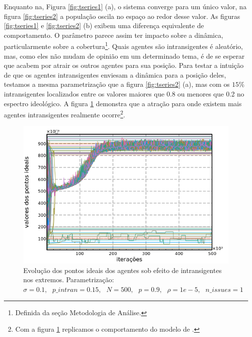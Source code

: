     Enquanto na, Figura \ref{fig:tseries1} (a), o sistema converge para um único
    valor, na figura \ref{fig:tseries2} a população oscila no espaço ao redor
    desse valor. As figuras \ref{fig:tseries1} e \ref{fig:tseries2} (b) exibem
    uma diferença equivalente de comportamento. O parâmetro parece assim ter
    impacto sobre a dinâmica, particularmente sobre a
    cobertura\footnote{Definida da seção Metodologia de Análise.}. Quais agentes
    são intransigentes é aleatório, mas, como eles não mudam de opinião em um
    determinado tema, é de se esperar que acabem por atrair os outros agentes
    para sua posição. Para testar a intuição de que os agentes intransigentes
    enviesam a dinâmica para a posição deles, testamos a mesma parametrização
    que a figura \ref{fig:tseries2} (a), mas com os \(15\%\) intransigentes
    localizados entre os valores maiores que 0.8 ou menores que 0.2 no espectro
    ideológico. A figura \ref{fig:tseries3} demonstra que a atração para onde
    existem mais agentes intransigentes realmente ocorre\footnote{Com a figura
      \ref{fig:tseries3} replicamos o comportamento do modelo de
      .}.

      \begin{figure}[H]
    \centering
    \includegraphics[scale=0.7]{ims/sigma01extremes.png}
    \caption{ Evolução dos pontos ideais dos agentes sob efeito de
      intransigentes nos extremos. Parametrização: \( \sigma = 0.1, \text{ }
      p\_intran = 0.15, \text{ } N = 500, \text{ } p = 0.9, \text{ } \rho = 1e-5,
      \text{ } n\_issues = 1 \)}
    \label{fig:tseries3}
  \end{figure}

